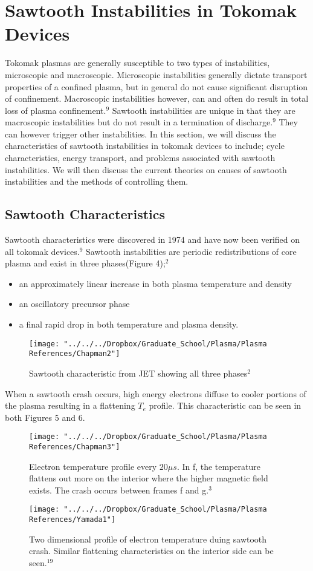 \documentclass{article}
\begin{document}
\section{Sawtooth Instabilities in Tokomak Devices}
Tokomak plasmas are generally susceptible to two types of instabilities, microscopic and macroscopic.  Microscopic instabilities generally dictate transport properties of a confined plasma, but in general do not cause significant disruption of confinement.  Macroscopic instabilities however, can and often do result in total loss of plasma confinement.$^{9}$  Sawtooth instabilities are unique in that they are macroscopic instabilities but do not result in a termination of discharge.$^{9}$  They can however trigger other instabilities.  In this section, we will discuss the characteristics of sawtooth instabilities in tokomak devices to include; cycle characteristics, energy transport, and problems associated with sawtooth instabilities.  We will then discuss the current theories on causes of sawtooth instabilities and the methods of controlling them.
\subsection{Sawtooth Characteristics}
Sawtooth characteristics were discovered in 1974 and have now been verified on all tokomak devices.$^{9}$  Sawtooth instabilities are periodic redistributions of core plasma and exist in three phases(Figure 4);$^{2}$
\begin{itemize}
\item an approximately linear increase in both plasma temperature and density
\item an oscillatory precursor phase
\item a final rapid drop in both temperature and plasma density.
\end{itemize}
\begin{figure}[h]
\centering
\texttt{[image: "../../../Dropbox/Graduate\_School/Plasma/Plasma References/Chapman2"]}
\caption{Sawtooth characteristic from JET showing all three phases$^{2}$}
\label{fig:Chapman2}
\end{figure}
When a sawtooth crash occurs, high energy electrons diffuse to cooler portions of the plasma resulting in a flattening $T_e$ profile.  This characteristic can be seen in both Figures 5 and 6.
\begin{figure}[h]
\centering
\texttt{[image: "../../../Dropbox/Graduate\_School/Plasma/Plasma References/Chapman3"]}
\caption{Electron temperature profile every $20\mu s$. In f, the temperature flattens out more on the interior where the higher magnetic field exists. The crash occurs between frames f and g.$^{3}$}
\label{fig:Chapman3}
\end{figure}
\begin{figure}[h]
\centering
\texttt{[image: "../../../Dropbox/Graduate\_School/Plasma/Plasma References/Yamada1"]}
\caption{Two dimensional profile of electron temperature duing sawtooth crash. Similar flattening characteristics on the interior side can be seen.$^{19}$}
\label{fig:Yamada1}
\end{figure}
\end{document}
